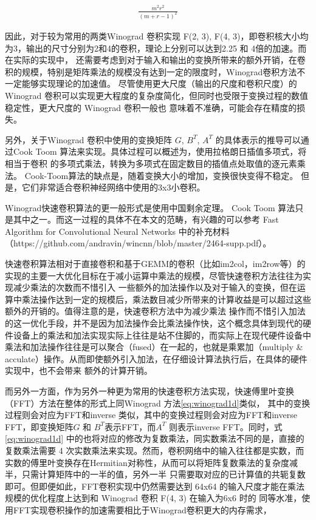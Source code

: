 \begin{align}
  \label{eq:winograd_reduction}
  \frac{m^2r^2}{(m+r-1)^2}
\end{align}

因此，对于较为常用的两类Winograd 卷积实现 F(2, 3), F(4, 3)，即卷积核大小均为3，输出的尺寸分别为2和4的卷积，理论上分别可以达到2.25 和 4倍的加速。而在实际的实现中，
还需要考虑到对于输入和输出的变换所带来的额外开销，在卷积的规模，特别是矩阵乘法的规模没有达到一定的限度时，Winograd卷积方法不一定能够实现理论的加速值。
尽管使用更大尺度（输出的尺度和卷积尺度）的Winograd 卷积可以实现更大程度的复杂度简化，但同时也受限于变换过程的数值稳定性，更大尺度的 Winograd 卷积一般也
意味着不准确，可能会存在精度的损失。

另外，关于Winograd 卷积中使用的变换矩阵 $G$, $B^T$, $A^T$ 的具体表示的推导可以通过Cook Toom 算法来实现。具体过程可以概述为，使用拉格朗日插值多项式，将相当于卷积
的多项式乘法，转换为多项式在固定数目的插值点处取值的逐元素乘法。 Cook-Toom算法的缺点是，随着变换大小的增加，变换很快变得不稳定。 但是，它们非常适合卷积神经网络中使用的3x3小卷积。

Winograd快速卷积算法的更一般形式是使用中国剩余定理。 Cook Toom 算法只是其中之一。而这一过程的具体不在本文的范畴，有兴趣的可以参考 Fast Algorithm for Convolutional 
Neural Networks 中的补充材料（https://github.com/andravin/wincnn/blob/master/2464-supp.pdf）。


快速卷积算法相对于直接卷积和基于GEMM的卷积（比如im2col，im2row等）的实现的主要一大优化目标在于减小运算中乘法的规模，尽管快速卷积方法往往为实现减少乘法的次数而不惜引入
一些额外的加法操作以及对于输入的变换，但在运算中乘法操作达到一定的规模后，乘法数目减少所带来的计算收益是可以超过这些额外的开销的。值得注意的是，快速卷积方法中为减少乘法
操作而不惜引入加法的这一优化手段，并不是因为加法操作会比乘法操作快，这个概念具体到现代的硬件设备上的乘法和加法实现实际上往往是站不住脚的，而实际上在现代硬件设备中
乘法和加法操作往往是可以聚合（fused）在一起的，也就是乘累加（multiply & acculate）操作。从而即使额外引入加法，在仔细设计算法执行后，在具体的硬件实现中，也不会带来
额外的计算开销。

而另外一方面，作为另外一种更为常用的快速卷积方法实现，快速傅里叶变换（FFT）方法在整体的形式上同Winograd 方法\ref{eq:winograd1d}类似，
其中的变换过程则会对应为FFT和inverse 类似，其中的变换过程则会对应为FFT和inverse
 FFT，即变换矩阵$G$ 和 $B^T$表示FFT，而$A^T$ 则表示inverse FFT。同时，式\ref{eq:winograd1d} 中的也将对应的修改为复数乘法，同实数乘法不同的是，直接的复数乘法需要
 4 次实数乘法来实现。然而，卷积网络中的输入往往都是实数，而实数的傅里叶变换存在Hermitian对称性，从而可以将矩阵复数乘法的复杂度减半，只需计算矩阵中的一半的值，另外一半
 只需要取对应的已计算值的共轭复数即可。但即便如此，FFT卷积实现中仍然需要达到 64x64 的输入尺度才能在乘法规模的优化程度上达到和 Winograd 卷积 F(4, 3) 在输入为6x6 时的
 同等水准，使用FFT实现卷积操作的加速需要相比于Winograd卷积更大的内存需求，

